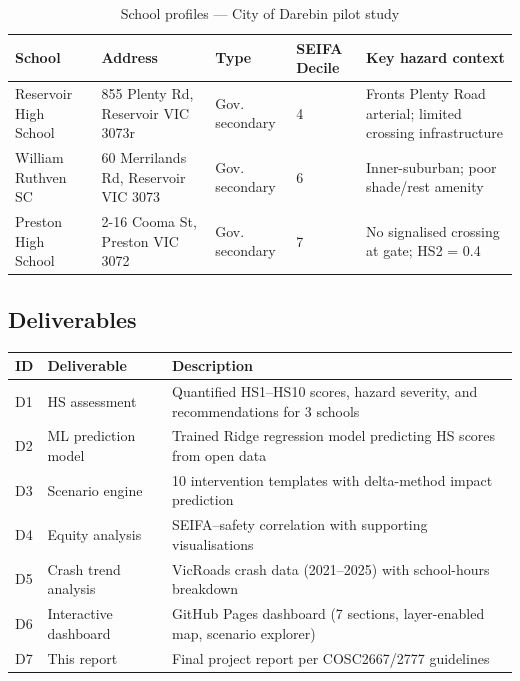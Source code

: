 \documentclass[11pt,a4paper]{article}
\begin{document}
\begin{table}[H]\centering\small
\caption{School profiles — City of Darebin pilot study}
\begin{tabular}{L{3.2cm}L{3.5cm}L{1.5cm}L{2cm}L{3.8cm}}
\toprule
\textbf{School} & \textbf{Address} & \textbf{Type} & \textbf{SEIFA Decile} & \textbf{Key hazard context} \\
\midrule
Reservoir High School & 855 Plenty Rd, Reservoir VIC 3073r & Gov. secondary & 4 & Fronts Plenty Road arterial; limited crossing infrastructure \\
William Ruthven SC & 60 Merrilands Rd, Reservoir VIC 3073 & Gov. secondary & 6 & Inner-suburban; poor shade/rest amenity \\
Preston High School &  2-16 Cooma St, Preston VIC 3072 & Gov. secondary & 7 & No signalised crossing at gate; HS2 = 0.4 \\
\bottomrule
\end{tabular}
\end{table}

\subsection{Deliverables}

\begin{table}[H]\centering\small
\begin{tabular}{C{0.6cm}L{3cm}L{10cm}}
\toprule
\textbf{ID} & \textbf{Deliverable} & \textbf{Description} \\
\midrule
D1 & HS assessment & Quantified HS1--HS10 scores, hazard severity, and recommendations for 3 schools \\
D2 & ML prediction model & Trained Ridge regression model predicting HS scores from open data \\
D3 & Scenario engine & 10 intervention templates with delta-method impact prediction \\
D4 & Equity analysis & SEIFA--safety correlation with supporting visualisations \\
D5 & Crash trend analysis & VicRoads crash data (2021--2025) with school-hours breakdown \\
D6 & Interactive dashboard & GitHub Pages dashboard (7 sections, layer-enabled map, scenario explorer) \\
D7 & This report & Final project report per COSC2667/2777 guidelines \\
\bottomrule
\end{tabular}
\end{table}
\end{document}
